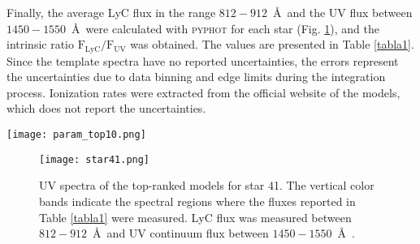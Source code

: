 \documentclass[baaa]{baaa}
\begin{document}
Finally, the average LyC flux in the range $812-912$~\AA\ and the UV flux between $1450-1550$~\AA\ were calculated with \textsc{pyphot} for each star (Fig. \ref{lyc_uv}), and the intrinsic ratio $\mathrm{F_{LyC}/F_{UV}}$ was obtained. The values are presented in Table \ref{tabla1}. Since the template spectra have no reported uncertainties,
the errors %
represent the uncertainties due to data binning and edge limits during the integration process.
Ionization rates were extracted from the official website of the models, which does not report the uncertainties.


\begin{figure*}[!t]
    \centering
    \texttt{[image: param\_top10.png]}
    \caption{Parameter-space of the PoWR models used in the analysis (gray dots). Each row corresponds to a different star.  The models in the top 10, which also exhibit the average extinction (as indicated in Fig. \ref{histogramas}), are color-coded based on the order of merit, with blue representing the first and red the last. All four stars are compatible with  $\mathrm{T_{eff}}>40 ~\mathrm{kK}$, which are the preferred models (blue dots) for stars 37, 42, and 47.}
    \label{param}
\end{figure*}

\begin{figure}
    \centering
    \texttt{[image: star41.png]}
    \caption{UV spectra of the top-ranked models for star 41. The vertical color bands indicate the spectral regions where the fluxes reported in Table \ref{tabla1} were measured. LyC flux was measured between $812 - 912$~\AA\ and UV continuum flux between $1450 - 1550$~\AA\ .}
    \label{lyc_uv}
\end{figure}
 
\end{document}
